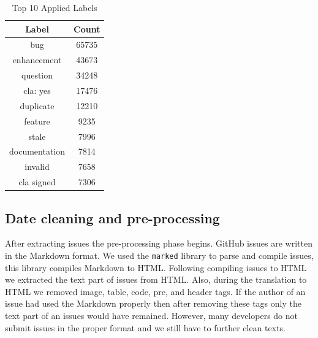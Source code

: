 \documentclass[conference]{IEEEtran}
\begin{document}
\begin{table}[t]
  \caption{Top 10 Applied Labels}
  \begin{center}
  \begin{tabular}{|c|c|}
  \hline
  \textbf{Label} & \textbf{Count}\\
  \hline
  bug           & 65735 \\
  \hline
  enhancement   & 43673 \\
  \hline
  question      & 34248 \\
  \hline
  cla: yes      & 17476 \\
  \hline
  duplicate     & 12210 \\
  \hline
  feature       & 9235 \\
  \hline
  stale         & 7996 \\
  \hline
  documentation & 7814 \\
  \hline
  invalid       & 7658 \\
  \hline
  cla signed    & 7306 \\
  \hline
  \end{tabular}
  \end{center}
  \label{tab:labels}
\end{table}

\subsection{Date cleaning and pre-processing}
After extracting issues the pre-processing phase begins. GitHub issues are written in the Markdown format.
We used the \verb|marked| \cite{web:marked} library to parse and compile issues, this library compiles
Markdown to HTML. Following compiling issues to HTML we extracted the text part of issues from HTML.
Also, during the translation to HTML we removed image, table, code, pre, and header tags. If the
author of an issue had used the Markdown properly then after removing these tags only the text part
of an issues would have remained. However, many developers do not submit issues in the proper format and we
still have to further clean texts. 
\end{document}
